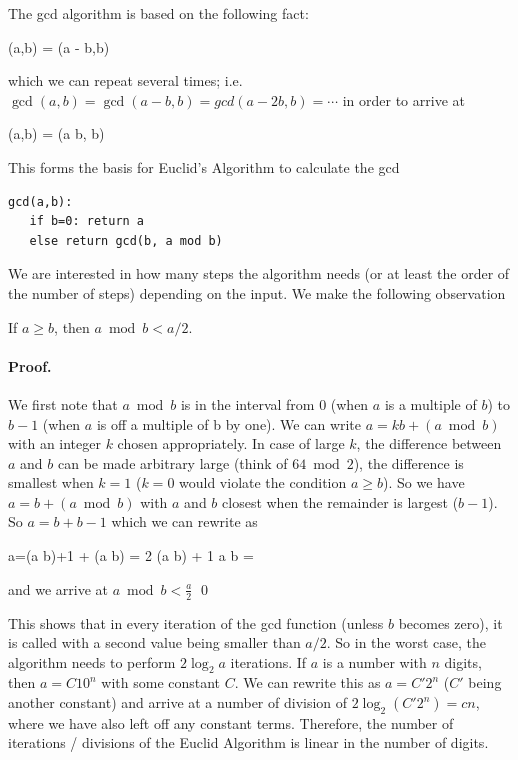 
The gcd algorithm is based on the following fact:

\bee
\gcd(a,b) = \gcd(a - b,b)
\eee

which we can repeat several times; i.e. $\gcd(a,b) = \gcd(a-b,b) = gcd(a-2b,b) = \cdots$ in order to arrive at

\bee
\gcd(a,b) = \gcd(a \bmod b, b)
\eee

This forms the basis for Euclid's Algorithm to calculate the gcd

\begin{verbatim}
gcd(a,b):
   if b=0: return a
   else return gcd(b, a mod b)
\end{verbatim}

We are interested in how many steps the algorithm needs (or at least the order of the number of steps) depending on the input. We make the following observation

\begin{theorem}
If $a \geq b$, then $a \bmod b < a/2$.
\end{theorem}

\paragraph{Proof.} We first note that $a \bmod b$ is in the interval from $0$ (when $a$ is a multiple of $b$) to $b-1$ (when $a$ is off a multiple of b by one). We can write $a = kb + (a \bmod b)$ with an integer $k$ chosen appropriately. In case of large $k$, the difference between $a$ and $b$ can be made arbitrary large (think of $64 \bmod 2$), the difference is smallest when $k=1$ ($k=0$ would violate the condition $a \geq b$). So we have $a=b + (a \bmod b)$ with $a$ and $b$ closest when the remainder is largest ($b-1$). So $a = b + b-1$ which we can rewrite as 

\bee
a=(a \bmod b)+1 + (a \bmod b) = 2 (a \bmod b) + 1 \rightarrow a \bmod b = 
\eee

and we arrive at $a \bmod b < \frac{a}{2}$ \qed

This shows that in every iteration of the gcd function (unless $b$ becomes zero), it is called with a second value being smaller than $a/2$. So in the worst case, the algorithm needs to perform $2 \log_2 a$ iterations. If $a$ is a number with $n$ digits, then $a = C 10^n$ with some constant $C$. We can rewrite this as $a = C' 2^n$ ($C'$ being another constant) and arrive at a number of division of $2 \log_2 (C' 2^n) = c n$, where we have also left off any constant terms. Therefore, the number of iterations / divisions of the Euclid Algorithm is linear in the number of digits.

